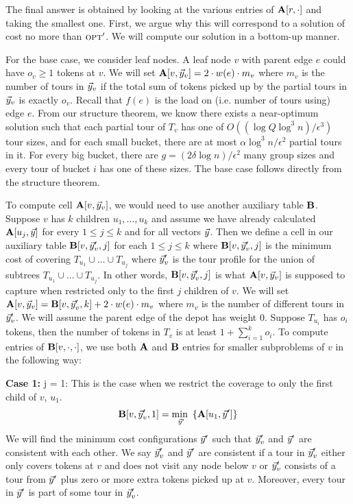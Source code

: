 \documentclass[twoside,leqno]{article}
\newcommand{\opt}{\mbox{\sc opt}}
\newcommand{\mi}[1]{\underset{#1}{\text{min }}}
\newcommand{\eps}{\epsilon}
\begin{document}
The final answer is obtained by looking at the various entries of $\textbf{A}[r, \cdot ]$ and taking the smallest one. First, we argue why this will correspond to a solution of cost no more than $\opt'$. We will compute our solution in a bottom-up manner.

For the base case, we consider leaf nodes. A leaf node $v$ with parent edge $e$ could have $o_v \ge 1$ tokens at $v$. We will set $\textbf{A}[v,\vec{y}_v] = 2 \cdot w(e) \cdot m_v$ where $m_v$ is the number of tours in $\vec{y}_v$ if the total sum of tokens picked up by the partial tours in $\vec{y}_v$ is exactly $o_v$. Recall that $f(e)$ is the load on (i.e. number of tours using) edge $e$.
From our structure theorem, we know there exists a near-optimum solution such that each partial tour
of $T_v$ has one of $O((\log Q \log^3 n)/\eps^3)$ tour sizes, and for each small bucket, there are at most $\alpha \log^3n /\eps^2$ partial tours in it. For every big bucket, there are $g = (2 \delta \log n)/\eps^2$ many group sizes and every tour of bucket $i$ has one of these sizes. The base case follows directly from the structure theorem.

To compute cell $\textbf{A}[v, \vec{y}_v]$, we would need to use another auxiliary table $\textbf{B}$. Suppose $v$ has $k$ children $u_1, \ldots, u_k$ and assume we have already calculated $\textbf{A}[u_j, \vec{y}]$ for every $1 \le j \le k$ and for all vectors $\vec{y}$. Then we define a cell in our auxiliary table $\textbf{B}[v,\vec{y}_v', j]$ for each $1 \le j \le k$ where $\textbf{B}[v,\vec{y}_v', j]$ is the minimum cost of covering $T_{u_1} \cup \ldots \cup T_{u_j}$ where $\vec{y}_v'$ is the tour profile for the union of subtrees $T_{u_1} \cup \ldots \cup T_{u_j}$. In other words, $\textbf{B}[v, \vec{y}_v', j]$ is what $\textbf{A}[v, \vec{y}_v]$ is supposed to capture when restricted only to the first $j$ children of $v$. We will set $\textbf{A}[v, \vec{y}_v] = \textbf{B}[v, \vec{y}_v', k] + 2 \cdot w(e) \cdot m_v$ where $m_v$ is the number of different tours in $\vec{y}_v'$. We will assume the parent edge of the depot has weight 0. Suppose $T_{u_i}$ has $o_i$ tokens, then the number of tokens in $T_v$ is at least $1 + \sum_{i = 1}^k o_i$. To compute entries of $\textbf{B}[v, \cdot, \cdot]$, we use both $\textbf{A}$ and $\textbf{B}$ entries for smaller subproblems of $v$ in the following way:

\textbf{Case 1:} j = 1: This is the case when we restrict the coverage to only the first child of $v$, $u_1$.
\begin{equation*}
    \begin{split}
        \bbold[v,\yvec_v',1] & = \mi{\yvec'} \left\{ \abold[u_1, \yvec'] \right\} \\
    \end{split}
\end{equation*}
We will find the minimum cost configurations $\vec{y}'$ such that $\vec{y}_v'$ and $\vec{y}'$ are consistent with each other. We say $\vec{y}_v'$ and $\vec{y}'$ are consistent if a tour in $\vec{y}_v'$ either only covers tokens at $v$ and does not visit any node below $v$ or $\vec{y}_v'$ consists of a tour from $\vec{y}'$ plus zero or more extra tokens picked up at $v$. Moreover, every tour in $\vec{y}'$ is part of some tour in $\vec{y}_v'$.
\end{document}
